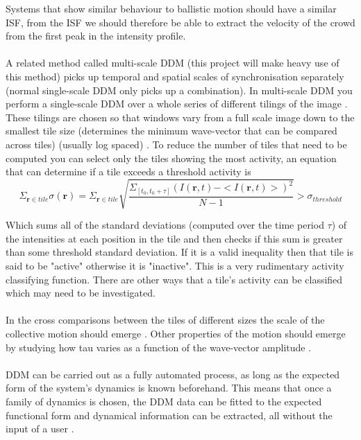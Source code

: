 \documentclass[11pt]{article}
\begin{document}
Systems that show similar behaviour to ballistic motion should have a similar ISF, from the ISF we should therefore be able to extract the velocity of the crowd from the first peak in the intensity profile.
\\\\
A related method called multi-scale DDM (this project will make heavy use of this method) picks up temporal and spatial scales of synchronisation separately (normal single-scale DDM only picks up a combination).
In multi-scale DDM you perform a single-scale DDM over a whole series of different tilings of the image \cite{ddm1}. These tilings are chosen so that windows vary from a full scale image down to the smallest tile size (determines the minimum wave-vector that can be compared across tiles) (usually log spaced) \cite{ddm1}.
To reduce the number of tiles that need to be computed you can select only the tiles showing the most activity, an equation that can determine if a tile exceeds a threshold activity is
\begin{equation}
    \Sigma_{\textbf{r} \in tile} \sigma(\textbf{r}) = \Sigma_{\textbf{r} \in tile} \sqrt{\frac{\Sigma_{[t_0, t_0 + \tau]} (I(\mathbf{r}, t) - <I(\mathbf{r}, t)>)^2}{N - 1}} > \sigma_{threshold}
\end{equation}

Which sums all of the standard deviations (computed over the time period $\tau$) of the intensities at each position in the tile and then checks if this sum is greater than some threshold standard deviation.
If it is a valid inequality then that tile is said to be "active" otherwise it is "inactive".\cite{ddm2}
This is a very rudimentary activity classifying function.
There are other ways that a tile's activity can be classified which may need to be investigated.
\\\\
In the cross comparisons between the tiles of different sizes the scale of the collective motion should emerge \cite{ddm1}.
Other properties of the motion should emerge by studying how tau varies as a function of the wave-vector amplitude \cite{ddm1}.
\\\\
DDM can be carried out as a fully automated process, as long as the expected form of the system's dynamics is known beforehand. This means that once a family of dynamics is chosen, the DDM data can be fitted to the expected functional form and dynamical information can be extracted, all without the input of a user  \cite{ddm1}.
\end{document}
